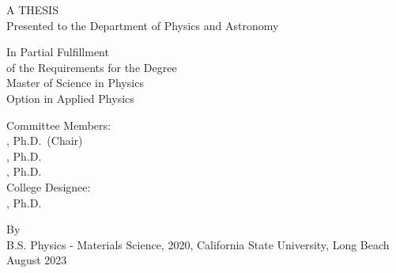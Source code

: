 \clearpage

\begin{titlepage}
    \begin{center}
  
        \MakeUppercase{ \ttitle }
        
        \vspace{2.6cm}
        
A THESIS \\  \medskip
Presented to the Department of Physics and Astronomy \\ \medskip
\univname
        
        \vspace{2.8cm}
        
        In Partial Fulfillment\\
        \medskip
        of the Requirements for the Degree\\
        \medskip
        Master of Science in Physics\\
        \medskip
        Option in Applied Physics
        
        \vspace{2.8cm}
        
        Committee Members:\\
        \medskip
        \advisorname, Ph.D.~(Chair)\\
        \memberonename, Ph.D.\\
        \membertwoname, Ph.D.\\
        \bigskip
        College Designee:\\
        \medskip
        \deptchairname, Ph.D.
        
        \vfill
        
        By \authorname \\
        \medskip
        B.S. Physics - Materials Science, 2020, California State University, Long Beach\\
        \medskip
		August 2023
		
        
    \end{center}


\end{titlepage}


